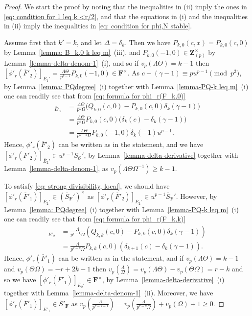 \documentclass[11pt]{amsart}
\theoremstyle{definition}
\numberwithin{equation}{subsection}
\theoremstyle{plain}
\theoremstyle{plain}
\theoremstyle{plain}
\theoremstyle{plain}
\theoremstyle{plain}
\theoremstyle{plain}
\theoremstyle{plain}
\theoremstyle{plain}
\theoremstyle{plain}
\theoremstyle{plain}
\theoremstyle{plain}
\theoremstyle{plain}
\theoremstyle{definition}
\theoremstyle{definition}
\theoremstyle{definition}
\theoremstyle{remark}
\renewcommand{\(}{\textup{(}}
\renewcommand{\)}{\textup{)}}
\newcommand{\Z}{\mathbf{Z}}
\newcommand{\F}{\mathbf{F}}
\newcommand{\barS}{\overline{S}}
\newcommand{\cO}{\mathcal{O}}
\newcommand{\barE}{\overline{E}}
\newcommand{\barF}{\overline{F}}
\begin{document}
\begin{proof}
We start the proof by noting that the inequalities in (ii) imply the ones in \eqref{eq: condition for 1 leq k <r/2}, and that the equations in (i) and the inequalities in (ii) imply the inequalities in \eqref{eq: condition for phi,N stable}.



Assume first that $k'=k$, and let $\Delta=\delta_k$. Then we have $P_{k,0}(c,x)=P_{k,0}(c,0)$ by Lemma~\ref{lemma: B_k,0 k leq m}~(iii), and $P_{k,0}(-1,0)\in\Z_{(p)}^{\times}$ by Lemma~\ref{lemma-delta-denom-1}~(i), and so if $v_p(\Lambda\Theta)=k-1$ then $[\phi'_r(\barF'_2)]_{\barE_1'}=\frac{\Lambda\Theta}{p^{k-1}}P_{k,0}(-1,0)\in\F^{\times}$. As $c-(\gamma-1)\equiv pu^{p-1}\pmod{p^2}$, by Lemma~\ref{lemma: PQdegree}~(i) together with Lemma~\ref{lemma-PQ-k leq m}~(i) one can readily see that from \eqref{eq: formula for phi_r(F_k,0)}
\begin{align*}
[\phi'_r(\barF'_2)]_{\barE'_2}&= \frac{\Lambda\Theta}{p^k\Omega}\big(Q_{k,0}(c,0)-P_{k,0}(c,0)\delta_k(\gamma-1)\big)\\
&=\frac{\Lambda\Theta}{p^k\Omega}P_{k,0}(c,0)\big(\delta_k(c)-\delta_k(\gamma-1)\big)\\
&=\frac{\Lambda\Theta}{p^{k-1}\Omega}P_{k,0}(-1,0)\dot{\delta}_k(-1)u^{p-1}.
\end{align*}
Hence, $\phi'_r(\barF'_2)$ can be written as in the statement, and we have $[\phi'_r(\barF'_2)]_{\barE_2'}\in u^{p-1}S_\cO'$, by Lemma~\ref{lemma-delta-derivative} together with Lemma~\ref{lemma-delta-denom-1}, as $v_p(\Lambda\Theta\Omega^{-1})\geq k-1$.

To satisfy \eqref{eq: strong divisibility, local}, we should have $[\phi'_r(\barF'_1)]_{\barE_2'}\in (\barS_\F')^\times$ as $[\phi'_r(\barF'_2)]_{\barE_2'}\in u^{p-1}\barS_\F'$. However, by Lemma~\ref{lemma: PQdegree}~(i) together with Lemma~\ref{lemma-PQ-k leq m}~(i) one can readily see that from \eqref{eq: formula for phi_r(F_k,k)}
\begin{align*}
[\phi'_r(\barF'_1)]_{\barE'_2}&=\frac{\Lambda}{p^{r-k}\Omega}\left(Q_{k,k}(c,0) -P_{k,k}(c,0)\delta_{k}(\gamma-1)\right) \\ &=\frac{\Lambda}{p^{r-k}\Omega}P_{k,k}(c,0)\left(\delta_{k+1}(c)-\delta_k(\gamma-1)\right).
\end{align*}
Hence, $\phi'_r(\barF'_1)$ can be written as in the statement, and if $v_p(\Lambda\Theta)=k-1$ and $v_p(\Theta\Omega)=-r+2k-1$ then $v_p(\frac{\Lambda}{\Omega})=v_p(\Lambda\Theta)-v_p(\Theta\Omega)=r-k$ and so we have $[\phi'_r(\barF'_1)]_{\barE_2'}\in \F^\times$, by Lemma~\ref{lemma-delta-derivative}~(i) together with Lemma~\ref{lemma-delta-denom-1}~(ii). Moreover, we have $[\phi'_r(\barF'_1)]_{\barE'_1}\in \barS'_\F$ as $v_p(\frac{\Lambda}{p^{r-k-1}})=v_p(\frac{\Lambda}{p^{r-k}\Omega})+v_p(\Omega)+1\geq 0$.



\end{proof}
\end{document}
